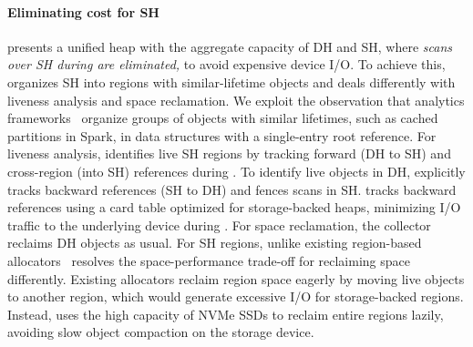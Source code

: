 \paragraph{\textbf{Eliminating \teraheapGC cost for SH}}
%
\teraheapName{} presents a unified heap with the aggregate capacity of DH and SH, where \emph{scans over SH during \teraheapGC are eliminated,} to avoid expensive device I/O.
%
To achieve this, \teraheapName{} organizes SH into regions with similar-lifetime objects and deals differently with liveness analysis and space reclamation.
%
We exploit the observation that analytics frameworks~\cite{zaharia:spark, giraph} organize groups of objects with similar lifetimes, such as cached partitions in Spark, in data structures with a single-entry root reference.
%
For liveness analysis, \teraheapName{} identifies live SH regions by tracking forward (DH to SH) and cross-region (into SH) references during \teraheapGC.
To identify live objects in DH, \teraheapName{} explicitly tracks backward references (SH to DH) and fences \teraheapGC scans in SH.
\teraheapName{} tracks backward references using a card table optimized for storage-backed heaps, minimizing I/O traffic to the underlying device during \teraheapGC.
%
For space reclamation, the collector reclaims DH objects as usual.
For SH regions, unlike existing region-based allocators~\cite{gog:broom,khanh:yak} \teraheapName{} resolves the space-performance trade-off for reclaiming space differently.
Existing allocators reclaim region space eagerly by moving live objects to another region, which would generate excessive I/O for storage-backed regions.
Instead, \teraheapName{} uses the high capacity of NVMe SSDs to reclaim entire regions lazily, avoiding slow object compaction on the storage device.

